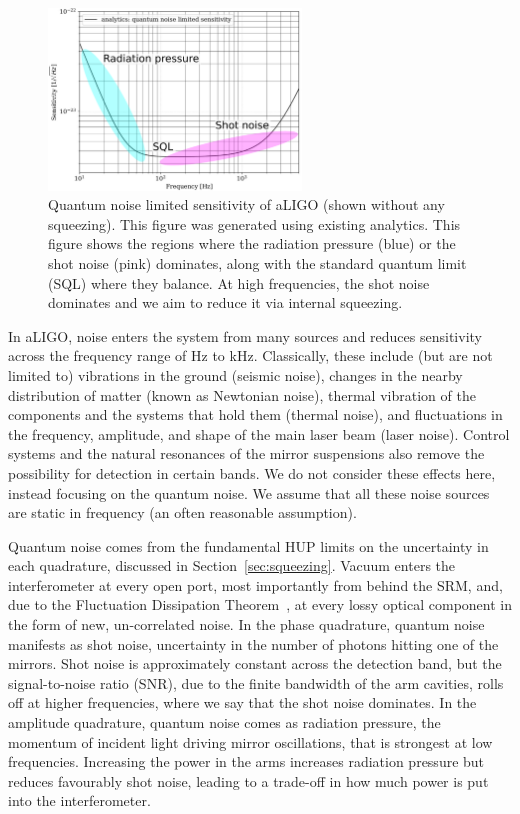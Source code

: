 \documentclass[aps,pra,superscriptaddress,reprint,nofootinbib]{revtex4-1}
\begin{document}
\begin{figure}[ht]%
	\begin{center}
	\includegraphics[width=0.6\textwidth]{figures/sqz_aLIGO_analytics_quantum_noise_budget-labelled.pdf}
	\end{center}
	\caption{Quantum noise limited sensitivity of aLIGO (shown without any squeezing). This figure was generated using existing analytics. This figure shows the regions where the radiation pressure (blue) or the shot noise (pink) dominates, along with the standard quantum limit (SQL) where they balance. At high frequencies, the shot noise dominates and we aim to reduce it via internal squeezing.}
	\label{fig:sqz_aLIGO_analytics_quantum_noise_budget}
\end{figure}


In aLIGO, noise enters the system from many sources and reduces sensitivity across the frequency range of Hz to kHz. Classically, these include (but are not limited to) vibrations in the ground (seismic noise), changes in the nearby distribution of matter (known as Newtonian noise), thermal vibration of the components and the systems that hold them (thermal noise), and fluctuations in the frequency, amplitude, and shape of the main laser beam (laser noise). Control systems and the natural resonances of the mirror suspensions also remove the possibility for detection in certain bands. We do not consider these effects here, instead focusing on the quantum noise. We assume that all these noise sources are static in frequency (an often reasonable assumption). 


Quantum noise comes from the fundamental HUP limits on the uncertainty in each quadrature, discussed in Section~\ref{sec:squeezing}. Vacuum enters the interferometer at every open port, most importantly from behind the SRM, and, due to the Fluctuation Dissipation Theorem~\cite{Danilishin_2012}, at every lossy optical component in the form of new, un-correlated noise. In the phase quadrature, quantum noise manifests as shot noise, uncertainty in the number of photons hitting one of the mirrors. Shot noise is approximately constant across the detection band, but the signal-to-noise ratio (SNR), due to the finite bandwidth of the arm cavities, rolls off at higher frequencies, where we say that the shot noise dominates. In the amplitude quadrature, quantum noise comes as radiation pressure, the momentum of incident light driving mirror oscillations, that is strongest at low frequencies. Increasing the power in the arms increases radiation pressure but reduces favourably shot noise, leading to a trade-off in how much power is put into the interferometer.
\end{document}
